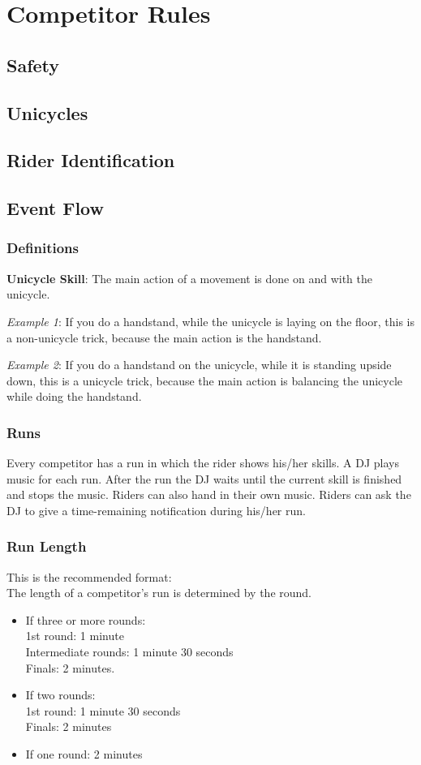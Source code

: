 \chapter{Competitor Rules}

\section{Safety}
\section{Unicycles}
\section{Rider Identification}
\section{Event Flow}

\subsection{Definitions}
\textbf{Unicycle Skill}: The main action of a movement is done on and with the unicycle.

\emph{Example 1}: If you do a handstand, while the unicycle is laying on the floor, this is a non-unicycle trick, because the main action is the handstand.

\emph{Example 2}: If you do a handstand on the unicycle, while it is standing upside down, this is a unicycle trick, because the main action is balancing the unicycle while doing the handstand.

\subsection{Runs}
Every competitor has a run in which the rider shows his/her skills.
A DJ plays music for each run.
After the run the DJ waits until the current skill is finished and stops the music.
Riders can also hand in their own music.
Riders can ask the DJ to give a time-remaining notification during his/her run.

\subsection{Run Length}
This is the recommended format: \\
The length of a competitor's run is determined by the round.
\begin{itemize}
\item If three or more rounds: \\
1st round: 1 minute \\
Intermediate rounds: 1 minute 30 seconds \\
Finals: 2 minutes.
\item If two rounds: \\
1st round: 1 minute 30 seconds \\
Finals: 2 minutes
\item If one round: 2 minutes
\end{itemize}

